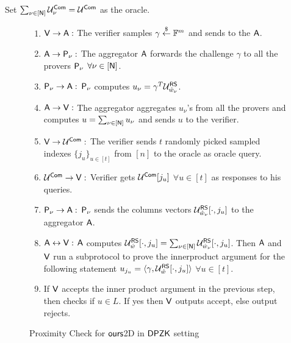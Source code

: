 Set $\sum_{\nu \in [\mathsf{N}]} \mathcal{U}^{\mathsf{Com}}_{\nu} = \mathcal{U}^{\mathsf{Com}}$ as the oracle.
\begin{figure}[h!]
	\begin{framed}
		\begin{enumerate}
			\item $\mathsf{V} \rightarrow \mathsf{A} : $ The verifier samples $\gamma \stackrel{\$} {\leftarrow} \mathbb{F}^m$ and sends to the $\mathsf{A}$.
		
			\item $\mathsf{A} \rightarrow \mathsf{P}_{\nu} : $ The aggregator $\mathsf{A}$ forwards the challenge $\gamma$ to all the provers $\mathsf{P}_{\nu}$ $\forall \nu\in [\mathsf{N}]$.
	
			\item $\mathsf{P}_{\nu} \rightarrow \mathsf{A} : $ $\mathsf{P}_{\nu}$ computes $u_{\nu} = \gamma^T\mathcal{U}^{\mathsf{RS}}_{\hat{w}_{\nu}}$.
			
			\item $\mathsf{A} \rightarrow \mathsf{V} : $ The aggregator aggregates $u_{\nu}$'s from all the provers and computes $u=\sum_{\nu\in[\mathsf{N}]} u_{\nu}$ and sends $u$ to the verifier.
	
			\item $\mathsf{V} \rightarrow \mathcal{U}^{\mathsf{Com}} : $ The verifier sends $t$ randomly picked sampled indexes $\{j_u\}_{u\in[t]}$ from $[n]$ to the oracle as oracle query.
			
			\item $\mathcal{U}^{\mathsf{Com}} \rightarrow \mathsf{V} : $ Verifier gets $\mathcal{U}^{\mathsf{Com}}[j_u]$ $\forall u\in[t]$ as responses to his queries.
	
			\item $\mathsf{P}_{\nu} \rightarrow \mathsf{A} : $ $\mathsf{P}_{\nu}$ sends the columns vectors 
			$\mathcal{U}^{\mathsf{RS}}_{\hat{w}_{\nu}}[\cdot,j_u]$ to the aggregator $\mathsf{A}$.
	
			\item $\mathsf{A} \leftrightarrow \mathsf{V} : $ $\mathsf{A}$ computes $\mathcal{U}^{\mathsf{RS}}_{\hat{w}}[\cdot,j_u] = \sum_{\nu\in[\mathsf{N}]} \mathcal{U}^{\mathsf{RS}}_{\hat{w}_{\nu}}[\cdot,j_u]$. Then $\mathsf{A}$ and $\mathsf{V}$ run a subprotocol to prove the innerproduct argument for the following statement $u_{j_u} = \langle \gamma,\mathcal{U}^{\mathsf{RS}}_{\hat{w}}[\cdot, j_u]\rangle$ $\forall u\in[t]$.
	
			\item If $\mathsf{V}$ accepts the inner product argument in the previous step, then checks if $u\in L$. If yes then $\mathsf{V}$ outputs accept, else output rejects.
		\end{enumerate}
	\end{framed}
\caption{Proximity Check for $\textsf{ours}$2D in $\mathsf{DPZK}$ setting}
\end{figure}


